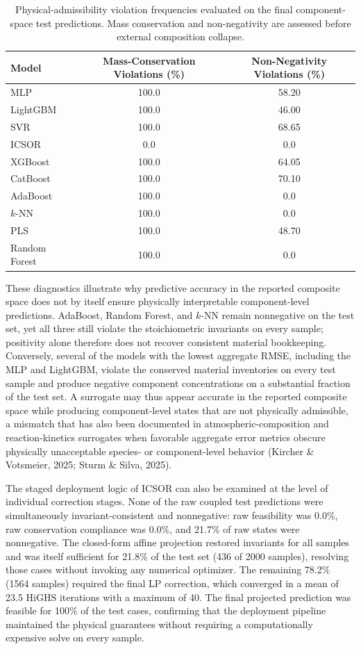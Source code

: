 \documentclass[a4paper,fleqn]{cas-sc}
\newenvironment{revblock}{\begingroup\color{revDefault}}{\endgroup}
\newenvironment{revblockr22}{\begingroup\color{revRtwoTwo}}{\endgroup}
\begin{document}
\begin{revblock}
\begin{revblockr22}
\begin{table}[htbp]
\centering
\caption{Physical-admissibility violation frequencies evaluated on the final component-space test predictions. Mass conservation and non-negativity are assessed before external composition collapse.}
\label{tab:results_physical_sample}
\scriptsize
\begin{tabular}{lcc}
\hline
Model & Mass-Conservation Violations (\%) & Non-Negativity Violations (\%) \\
\hline
MLP & 100.0 & 58.20 \\
LightGBM & 100.0 & 46.00 \\
SVR & 100.0 & 68.65 \\
ICSOR & 0.0 & 0.0 \\
XGBoost & 100.0 & 64.05 \\
CatBoost & 100.0 & 70.10 \\
AdaBoost & 100.0 & 0.0 \\
$k$-NN & 100.0 & 0.0 \\
PLS & 100.0 & 48.70 \\
Random Forest & 100.0 & 0.0 \\
\hline
\end{tabular}
\end{table}

These diagnostics illustrate why predictive accuracy in the reported composite space does not by itself ensure physically interpretable component-level predictions. AdaBoost, Random Forest, and $k$-NN remain nonnegative on the test set, yet all three still violate the stoichiometric invariants on every sample; positivity alone therefore does not recover consistent material bookkeeping. Conversely, several of the models with the lowest aggregate RMSE, including the MLP and LightGBM, violate the conserved material inventories on every test sample and produce negative component concentrations on a substantial fraction of the test set. A surrogate may thus appear accurate in the reported composite space while producing component-level states that are not physically admissible, a mismatch that has also been documented in atmospheric-composition and reaction-kinetics surrogates when favorable aggregate error metrics obscure physically unacceptable species- or component-level behavior (Kircher \& Votsmeier, 2025; Sturm \& Silva, 2025).

The staged deployment logic of ICSOR can also be examined at the level of individual correction stages. None of the raw coupled test predictions were simultaneously invariant-consistent and nonnegative: raw feasibility was 0.0\%, raw conservation compliance was 0.0\%, and 21.7\% of raw states were nonnegative. The closed-form affine projection restored invariants for all samples and was itself sufficient for 21.8\% of the test set (436 of 2000 samples), resolving those cases without invoking any numerical optimizer. The remaining 78.2\% (1564 samples) required the final LP correction, which converged in a mean of 23.5 HiGHS iterations with a maximum of 40. The final projected prediction was feasible for 100\% of the test cases, confirming that the deployment pipeline maintained the physical guarantees without requiring a computationally expensive solve on every sample.


\end{revblockr22}
\end{revblock}
\end{document}
